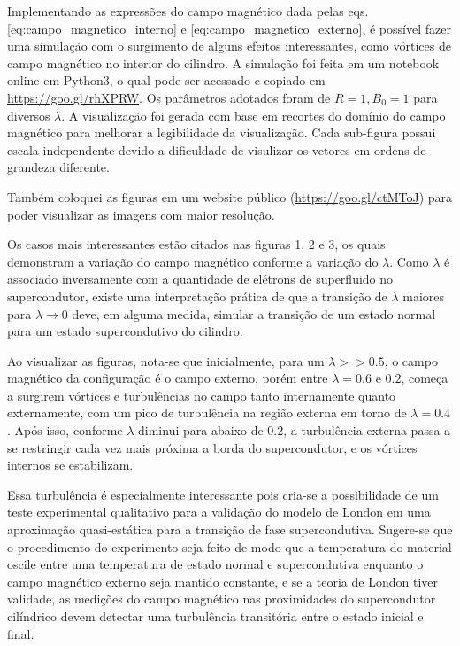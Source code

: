 \documentclass[%
 reprint,
 amsmath,amssymb,
 aps,
]{revtex4-1}
\begin{document}

Implementando as expressões do campo magnético dada pelas eqs. \ref{eq:campo_magnetico_interno} e \ref{eq:campo_magnetico_externo}, é possível fazer uma simulação com o surgimento de alguns efeitos interessantes, como vórtices de campo magnético no interior do cilindro. A simulação foi feita em um notebook online em Python3, o qual pode ser acessado e copiado em \url{https://goo.gl/rhXPRW}. Os parâmetros adotados foram de $R=1, B_0=1$ para diversos $\lambda$. A visualização foi gerada com base em recortes do domínio do campo magnético para melhorar a legibilidade da visualização. Cada sub-figura possui escala independente devido a dificuldade de visulizar os vetores em ordens de grandeza diferente.

Também coloquei as figuras em um website público (\url{https://goo.gl/ctMToJ}) para poder visualizar as imagens com maior resolução.

Os casos mais interessantes estão citados nas figuras 1, 2 e 3, os quais demonstram a variação do campo magnético conforme a variação do $\lambda$. Como $\lambda$ é associado inversamente com a quantidade de elétrons de superfluido no supercondutor, existe uma interpretação prática de que a transição de $\lambda$ maiores para $\lambda \rightarrow 0$ deve, em alguma medida, simular a transição de um estado normal para um estado supercondutivo do cilindro.

Ao visualizar as figuras, nota-se que inicialmente, para um $\lambda >> 0.5$, o campo magnético da configuração é o campo externo, porém entre $\lambda = 0.6 \mbox{ e } 0.2$, começa a surgirem vórtices e turbulências no campo tanto internamente quanto externamente, com um pico de turbulência na região externa em torno de $\lambda = 0.4$. Após isso, conforme $\lambda$ diminui para abaixo de $0.2$, a turbulência externa passa a se restringir cada vez mais próxima a borda do supercondutor, e os vórtices internos se estabilizam.

Essa turbulência é especialmente interessante pois cria-se a possibilidade de um teste experimental qualitativo para a validação do modelo de London em uma aproximação quasi-estática para a transição de fase supercondutiva. Sugere-se que o procedimento do experimento seja feito de modo que a temperatura do material oscile entre uma temperatura de estado normal e supercondutiva enquanto o campo magnético externo seja mantido constante, e se a teoria de London tiver validade,  as medições do campo magnético nas proximidades do supercondutor cilíndrico devem detectar uma turbulência transitória entre o estado inicial e final.
\end{document}
